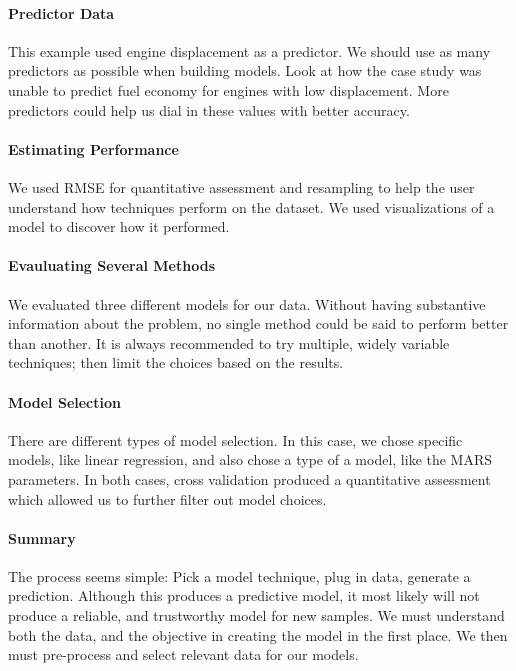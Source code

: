 \documentclass[../main.tex]{subfiles}
\begin{document}
    \paragraph{Predictor Data}
    This example used engine displacement as a predictor. We should use as many predictors as possible when building models.
    Look at how the case study was unable to predict fuel economy for engines with low displacement. More predictors
    could help us dial in these values with better accuracy.

    \paragraph{Estimating Performance}
    We used RMSE for quantitative assessment and resampling to help the user understand how techniques perform on the dataset.
    We used visualizations of a model to discover how it performed. 

    \paragraph{Evauluating Several Methods}
    We evaluated three different models for our data. Without having substantive information about the problem, no single method could
    be said to perform better than another. It is always recommended to try multiple, widely variable techniques; then limit the choices
    based on the results.
    
    \paragraph{Model Selection}
    There are different types of model selection. In this case, we chose specific models, like linear regression, and also chose a 
    type of a model, like the MARS parameters. In both cases, cross validation produced a quantitative assessment which allowed
    us to further filter out model choices.

    \paragraph{Summary}
    The process seems simple: Pick a model technique, plug in data, generate a prediction. Although this produces a predictive model, 
    it most likely will not produce a reliable, and trustworthy model for new samples. We must understand both the data, and the 
    objective in creating the model in the first place. We then must pre-process and select relevant data for our models. 
\end{document}
